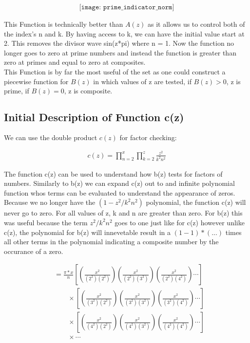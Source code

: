 \documentclass{article}
\begin{document}
\begin{align*}
\texttt{[image: prime\_indicator\_norm]}
\end{align*}

This Function is technically better than $A(z)$ as it allows us to control both of the index's n and k. By having access to k, we can have the initial value start at 2. This removes the divisor wave sin(z*pi) where n = 1. Now the function no longer goes to zero at prime numbers and instead the function is greater than zero at primes and equal to zero at composites. \\

This Function is by far the most useful of the set as one could construct a piecewise function for $B(z)$ in which values of z are tested, if $B(z) > 0$, z is prime, if $B(z) = 0$, z is composite. \\

\subsection*{Initial Description of Function c(z)}
We can use the double product $c(z)$ for factor checking:

\begin{align*}
	c(z) = \prod_{n=2}^x \prod_{k=2}^z \frac{z^2}{k^2n^2}
\end{align*}

The function c(z) can be used to understand how b(z) tests for factors of numbers. Similarly to b(z) we can expand c(z) out to and infinite polynomial function whos terms can be evaluated to understand the appearance of zeros. Because we no longer have the $(1-z^2/k^2n^2)$ polynomial, the function c(z) will never go to zero. For all values of z, k and n are greater than zero. For b(z) this was useful because the term $z^2/k^2n^2$ goes to one just like for c(z) however unlike c(z), the polynomial for b(z) will innevetable result in a $(1-1)*(...)$ times all other terms in the polynomial indicating a composite number by the occurance of a zero.

\begin{align*}
&= \frac{\pi*x}{n}\left[ \left(\frac{x^2}{(2^2)(2^2)}\right) \left(\frac{x^2}{(2^2)(3^2)}\right) \left(\frac{x^2}{(2^2)(4^2)}\right) \cdots \right] \\
&\qquad \times \left[ \left(\frac{x^2}{(3^2)(2^2)}\right) \left(\frac{x^2}{(3^2)(3^2)}\right) \left(\frac{x^2}{(3^2)(4^2)}\right) \cdots \right] \\
&\qquad \times \left[ \left(\frac{x^2}{(4^2)(2^2)}\right) \left(\frac{x^2}{(4^2)(3^2)}\right) \left(\frac{x^2}{(4^2)(4^2)}\right) \cdots \right] \\
&\qquad \times \cdots \\
\end{align*}
\end{document}
